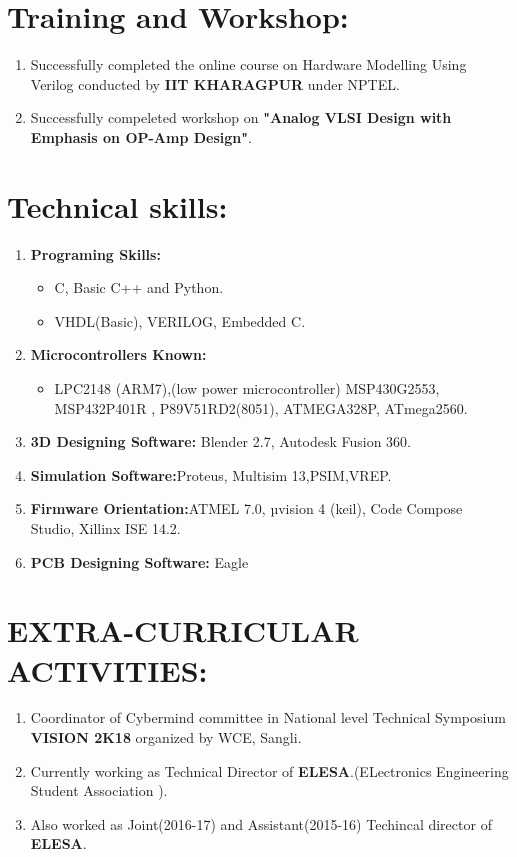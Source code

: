 \documentclass[16pt,a4paper]{article}
\begin{document}
\section{Training and Workshop:} 
\begin{enumerate}
	\item Successfully completed the online course on Hardware Modelling Using Verilog conducted by \textbf{IIT KHARAGPUR} under NPTEL.
	\item Successfully compeleted workshop on \textbf{"Analog VLSI Design with Emphasis on OP-Amp Design"}.
\end{enumerate} 
\section{Technical skills:} 
\begin{enumerate}
	\item \textbf{Programing Skills:}
	\begin{itemize}
		\item C, Basic C++ and  Python.
		\item VHDL(Basic), VERILOG, Embedded C.
	\end{itemize}
	\item \textbf{Microcontrollers Known:}
	\begin{itemize}
		\item LPC2148 (ARM7),(low power microcontroller) MSP430G2553, MSP432P401R , P89V51RD2(8051), ATMEGA328P, ATmega2560.
	\end{itemize}
	\item \textbf{3D Designing Software:}
	Blender 2.7, Autodesk Fusion 360.
	\item \textbf{Simulation Software:}Proteus, Multisim 13,PSIM,VREP.
	\item \textbf{Firmware Orientation:}ATMEL 7.0, µvision 4 (keil), Code Compose \\Studio, Xillinx ISE 14.2.
	\item \textbf{PCB Designing Software:} Eagle 
\end{enumerate}
\section{EXTRA-CURRICULAR ACTIVITIES:}
\begin{enumerate}
	\item Coordinator of Cybermind committee in National level Technical Symposium \textbf{VISION 2K18} organized by WCE, Sangli.
	\item Currently working as Technical Director of \textbf{ELESA}.(ELectronics Engineering Student Association ).
	\item Also worked as Joint(2016-17) and Assistant(2015-16) Techincal director of \textbf{ELESA}.
\end{enumerate}
   
\end{document}
